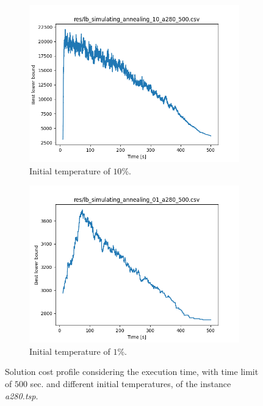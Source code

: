 \begin{figure}[!h]
\begin{subfigure}{.5\columnwidth}
		\centering
		\includegraphics[width=\columnwidth]{../res/lb_simulating_annealing_10_a280_500.png}
		\caption{Initial temperature of $10$\%.}
		\label{fig:sim_ann_10}
	\end{subfigure}
	\begin{subfigure}{.5\columnwidth}
		\centering
		\includegraphics[width=\columnwidth]{../res/lb_simulating_annealing_01_a280_500.png}
		\caption{Initial temperature of $1$\%.}
		\label{fig:sim_ann_1}
	\end{subfigure}
	\caption{Solution cost profile considering the execution time, with time limit of $500$ sec. and different initial temperatures, of the instance \textit{a280.tsp}.}
	\label{fig:sim_ann_temperature}
\end{figure}
